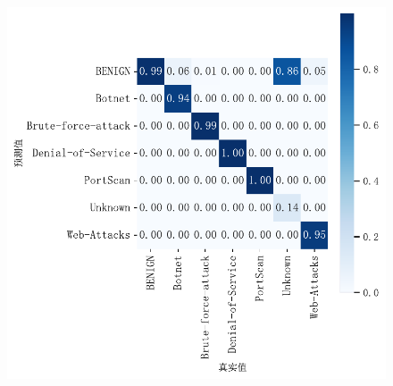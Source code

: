 \begin{figure}[htbp]
{\begin{minipage}{0.435\linewidth}
\includegraphics[width=1\linewidth]{img/exp2/5tr-lstm_confusion_matrix.pdf}
\label{fig:5tr-lstm_confusion_matrix}
\end{minipage}%
}


\end{figure}
